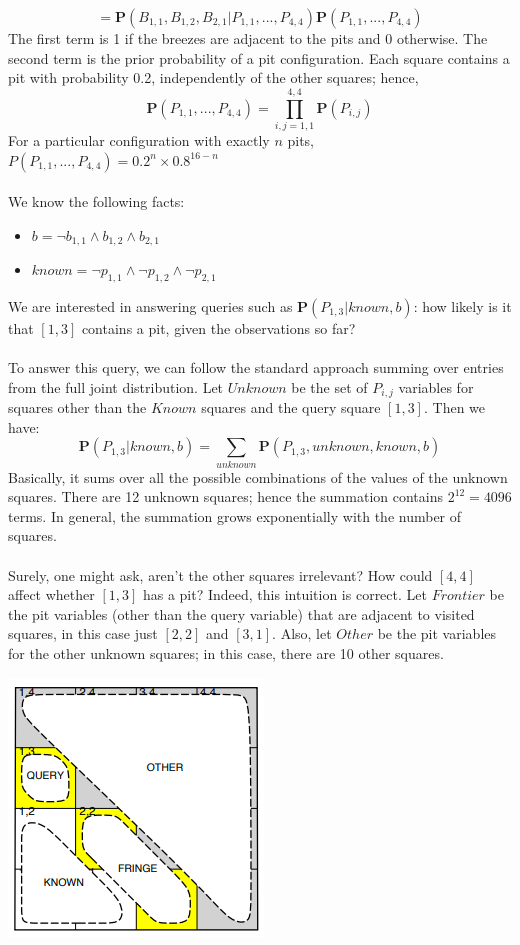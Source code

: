 \[= \textbf{P}(B_{1,1}, B_{1,2}, B_{2,1} | P_{1,1},...,P_{4,4})\textbf{P}(P_{1,1},...,P_{4,4}) \]
The first term is 1 if the breezes are adjacent to the pits and 0 otherwise. The second term is the prior probability of a pit configuration. Each square contains a pit with probability 0.2, independently of the other squares; hence,
\begin{equation}
    \textbf{P}(P_{1,1},...,P_{4,4}) = \prod_{i,j = 1,1}^{4,4}\textbf{P}(P_{i,j})
\end{equation}
For a particular configuration with exactly $n$ pits, $P(P_{1,1},...,P_{4,4}) = 0.2^n \times 0.8^{16-n}$\\\\
We know the following facts:
\begin{itemize}
    \item $b = \neg b_{1,1} \land b_{1,2} \land b_{2,1}$

    \item $known = \neg p_{1,1} \land \neg p_{1,2} \land \neg p_{2,1}$
\end{itemize}
We are interested in answering queries such as $\textbf{P}(P_{1,3} | known, b)$: how likely is it that $[1,3]$ contains a pit, given the observations so far?\\\\
To answer this query, we can follow the standard approach summing over entries from the full joint distribution.  Let $Unknown$ be the set of $P_{i,j}$ variables for squares other than the $Known$ squares and the query square $[1,3]$. Then we have:
\[\textbf{P}(P_{1,3} | known, b) = \sum_{unknown} \textbf{P}(P_{1,3}, unknown, known, b)\]
Basically, it sums over all the possible combinations of the values of the unknown squares. There are 12 unknown squares; hence the summation contains $2^{12} = 4096$ terms.  In general, the summation grows exponentially with the number of squares.\\\\
Surely, one might ask, aren’t the other squares irrelevant? How could $[4,4]$ affect whether $[1,3]$ has a pit? Indeed, this intuition is correct. Let $Frontier$ be the pit variables (other than the query variable) that are adjacent to visited squares, in this case just $[2,2]$ and $[3,1]$.  Also, let $Other$ be the pit variables for the other unknown squares; in this case, there are 10 other squares.
\begin{center}
    \includegraphics[]{images/wumpus-probs2.png}
\end{center}
